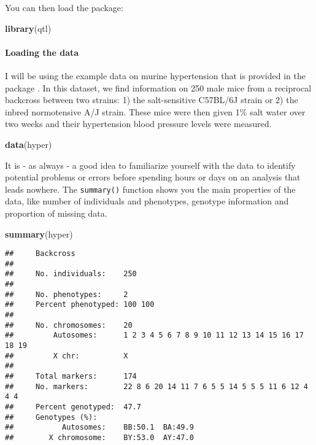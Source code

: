 \documentclass[12pt,]{krantz}
\newenvironment{Shaded}{\begin{snugshade}}{\end{snugshade}}
\newcommand{\KeywordTok}[1]{\textcolor[rgb]{0.27,0.27,0.27}{\textbf{{#1}}}}
\newcommand{\NormalTok}[1]{{#1}}
\let\oldparagraph\paragraph
\renewcommand{\paragraph}[1]{\oldparagraph{#1}\mbox{}}
\theoremstyle{definition}
\theoremstyle{definition}
\theoremstyle{remark}
\begin{document}
You can then load the package:

\begin{Shaded}
\begin{Highlighting}[]
\KeywordTok{library}\NormalTok{(qtl)}
\end{Highlighting}
\end{Shaded}

\paragraph{Loading the data}\label{loading-the-data}

I will be using the example data on murine hypertension that is provided
in the package \citep{Sugiyama200170}. In this dataset, we find
information on 250 male mice from a reciprocal backcross between two
strains: 1) the salt-sensitive C57BL/6J strain or 2) the inbred
normotensive A/J strain. These mice were then given 1\% salt water over
two weeks and their hypertension blood pressure levels were measured.

\begin{Shaded}
\begin{Highlighting}[]
\KeywordTok{data}\NormalTok{(hyper)}
\end{Highlighting}
\end{Shaded}

It is - as always - a good idea to familiarize yourself with the data to
identify potential problems or errors before spending hours or days on
an analysis that leads nowhere. The \texttt{summary()} function shows
you the main properties of the data, like number of individuals and
phenotypes, genotype information and proportion of missing data.

\begin{Shaded}
\begin{Highlighting}[]
\KeywordTok{summary}\NormalTok{(hyper)}
\end{Highlighting}
\end{Shaded}

\begin{verbatim}
##     Backcross
## 
##     No. individuals:    250 
## 
##     No. phenotypes:     2 
##     Percent phenotyped: 100 100 
## 
##     No. chromosomes:    20 
##         Autosomes:      1 2 3 4 5 6 7 8 9 10 11 12 13 14 15 16 17 18 19 
##         X chr:          X 
## 
##     Total markers:      174 
##     No. markers:        22 8 6 20 14 11 7 6 5 5 14 5 5 5 11 6 12 4 4 4 
##     Percent genotyped:  47.7 
##     Genotypes (%):    
##           Autosomes:    BB:50.1  BA:49.9 
##        X chromosome:    BY:53.0  AY:47.0
\end{verbatim}
\end{document}
